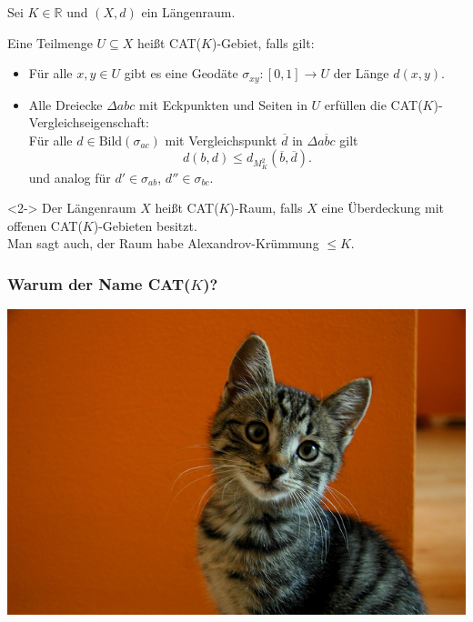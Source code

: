 \documentclass{beamer}
\newcommand{\R}{\mathbb{R}} %
\newcommand{\Bild}{\mathrm{Bild}} %
\renewcommand{\emph}[1]{\textcolor{Emph}{#1}}
\theoremstyle{definition}
\begin{document}
\begin{frame}
  Sei $K \in \R$ und $(X, d)$ ein Längenraum.

  \begin{definition}
    Eine Teilmenge $U \subseteq X$ heißt \emph{CAT($K$)-Gebiet}, falls gilt:
    \begin{itemize}
      \item Für alle $x, y \in U$ gibt es eine Geodäte $\sigma_{xy} : \left[0,1\right] \to U$ der Länge $d(x, y)$.
      \item Alle Dreiecke $\Delta abc$ mit Eckpunkten und Seiten in $U$ erfüllen die CAT($K$)-Vergleichseigenschaft:\\
      Für alle $d \in \Bild(\sigma_{ac})$ mit Vergleichspunkt $\overline{d}$ in $\Delta \overline{abc}$ gilt
      \[ d(b, d) \leq d_{M_K^2}(\overline{b}, \overline{d}). \]
      und analog für $d' \in \sigma_{ab}$, $d'' \in \sigma_{bc}$.
    \end{itemize}
  \end{definition}

  \begin{definition}<2->
    Der Längenraum $X$ heißt \emph{CAT($K$)-Raum}, falls $X$ eine Überdeckung mit offenen CAT($K$)-Gebieten besitzt.\\
    Man sagt auch, der Raum habe \emph{Alexandrov-Krümmung $\leq K$}.
  \end{definition}
\end{frame}

\begin{frame}
  \frametitle{Warum der Name CAT($K$)?}

  \begin{center}
    \includegraphics[scale=0.4]{bilder/cat.jpg}
  \end{center}
\end{frame}
\end{document}
